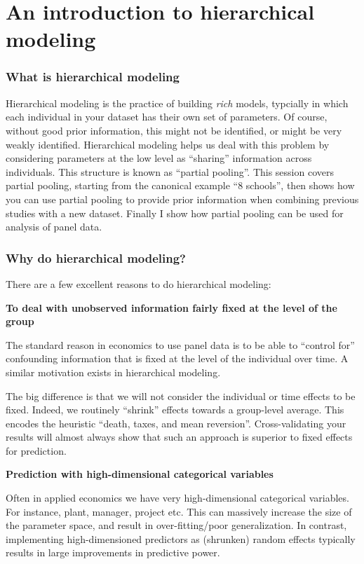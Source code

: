 \documentclass[]{book}
\begin{document}
\chapter{An introduction to hierarchical modeling}\label{hierarchical}

\subsection{What is hierarchical
modeling}\label{what-is-hierarchical-modeling}

Hierarchical modeling is the practice of building \emph{rich} models,
typcially in which each individual in your dataset has their own set of
parameters. Of course, without good prior information, this might not be
identified, or might be very weakly identified. Hierarchical modeling
helps us deal with this problem by considering parameters at the low
level as ``sharing'' information across individuals. This structure is
known as ``partial pooling''. This session covers partial pooling,
starting from the canonical example ``8 schools'', then shows how you
can use partial pooling to provide prior information when combining
previous studies with a new dataset. Finally I show how partial pooling
can be used for analysis of panel data.

\subsection{Why do hierarchical
modeling?}\label{why-do-hierarchical-modeling}

There are a few excellent reasons to do hierarchical modeling:

\textbf{To deal with unobserved information fairly fixed at the level of
the group}

The standard reason in economics to use panel data is to be able to
``control for'' confounding information that is fixed at the level of
the individual over time. A similar motivation exists in hierarchical
modeling.

The big difference is that we will not consider the individual or time
effects to be fixed. Indeed, we routinely ``shrink'' effects towards a
group-level average. This encodes the heuristic ``death, taxes, and mean
reversion''. Cross-validating your results will almost always show that
such an approach is superior to fixed effects for prediction.

\textbf{Prediction with high-dimensional categorical variables}

Often in applied economics we have very high-dimensional categorical
variables. For instance, plant, manager, project etc. This can massively
increase the size of the parameter space, and result in
over-fitting/poor generalization. In contrast, implementing
high-dimensioned predictors as (shrunken) random effects typically
results in large improvements in predictive power.
\end{document}
